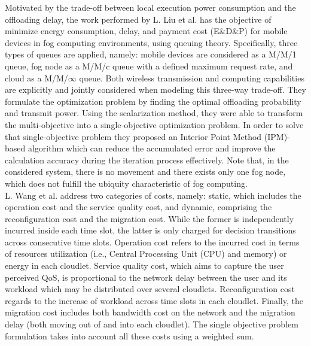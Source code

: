 \noindent\tab Motivated by the trade-off between local execution power consumption and the offloading delay, the work performed by L. Liu et al. \cite{liu2018multiobjective} has the objective of minimize energy consumption, delay, and payment cost (E\&D\&P) for mobile devices in fog computing environments, using queuing theory. Specifically, three types of queues are applied, namely: mobile devices are considered as a M/M/1 queue, fog node as a M/M/c queue with a defined maximum request rate, and cloud as a M/M/$\infty$ queue. Both wireless transmission and computing capabilities are explicitly and jointly considered when modeling this three-way trade-off. They formulate the optimization problem by finding the optimal offloading probability and transmit power. Using the scalarization method, they were able to transform the multi-objective into a single-objective optimization problem. In order to solve that single-objective problem they proposed an Interior Point Method (IPM)-based algorithm which can reduce the accumulated error and improve the calculation accuracy during the iteration process effectively. Note that, in the considered system, there is no movement and there exists only one fog node, which does not fulfill the ubiquity characteristic of fog computing.\\
\noindent\tab L. Wang \cite{wang2018moera} et al. address two categories of costs, namely: static, which includes the operation cost and the service quality cost, and dynamic, comprising the reconfiguration cost and the migration cost. While the former is independently incurred inside each time slot, the latter is only charged for decision transitions across consecutive time slots. Operation cost refers to the incurred cost in terms of resources utilization (i.e., Central Processing Unit (CPU) and memory) or energy in each cloudlet. Service quality cost, which aims to capture the user perceived QoS, is proportional to the network delay between the user and its workload which may be distributed over several cloudlets. Reconfiguration cost regards to the increase of workload across time slots in each cloudlet. Finally, the migration cost includes both bandwidth cost on the network and the migration delay (both moving out of and into each cloudlet). The single objective problem formulation takes into account all these costs using a weighted sum.
